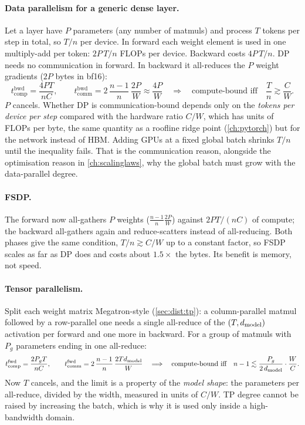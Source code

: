 \paragraph{Data parallelism for a generic dense layer.} Let a layer have $P$ parameters (any
number of matmuls) and process $T$ tokens per step in total, so $T/n$ per device. In forward each
weight element is used in one multiply-add per token: $2P\,T/n$ FLOPs per device. Backward costs
$4P\,T/n$. DP needs no communication in forward. In backward it all-reduces the $P$ weight
gradients ($2P$ bytes in bf16):
\[
  t_\text{comp}^\text{bwd} = \frac{4PT}{nC},\qquad
  t_\text{comm}^\text{bwd} = 2\,\frac{n-1}{n}\,\frac{2P}{W}\approx\frac{4P}{W}
  \quad\Longrightarrow\quad
  \text{compute-bound iff}\quad \frac{T}{n} \gtrsim \frac{C}{W}.
\]
$P$ cancels. Whether DP is communication-bound depends only on the \emph{tokens per device per
step} compared with the hardware ratio $C/W$, which has units of FLOPs per byte, the same
quantity as a roofline ridge point (\cref{ch:pytorch}) but for the network instead of HBM. Adding GPUs at
a fixed global batch shrinks $T/n$ until the inequality fails. That is the communication
reason, alongside the optimisation reason in \cref{ch:scalinglaws}, why the global batch must grow
with the data-parallel degree.

\paragraph{FSDP.} The forward now all-gathers $P$ weights ($\frac{n-1}{n}\frac{2P}{W}$) against
$2PT/(nC)$ of compute; the backward all-gathers again and reduce-scatters instead of all-reducing.
Both phases give the same condition, $T/n \gtrsim C/W$ up to a constant factor, so FSDP scales as far
as DP does and costs about $1.5\times$ the bytes. Its benefit is memory, not speed.

\paragraph{Tensor parallelism.} Split each weight matrix Megatron-style
(\cref{sec:dist:tp}): a column-parallel matmul followed by a row-parallel one needs a single
all-reduce of the $(T, d_{\text{model}})$ activation per forward and one more in backward. For a group of
matmuls with $P_g$ parameters ending in one all-reduce:
\[
  t_\text{comp}^\text{fwd} = \frac{2P_gT}{nC},\qquad
  t_\text{comm}^\text{fwd} = 2\,\frac{n-1}{n}\,\frac{2Td_{\text{model}}}{W}
  \quad\Longrightarrow\quad
  \text{compute-bound iff}\quad n - 1 \lesssim \frac{P_g}{2\,d_{\text{model}}}\cdot\frac{W}{C}.
\]
Now $T$ cancels, and the limit is a property of the \emph{model shape}: the parameters per
all-reduce, divided by the width, measured in units of $C/W$. TP degree cannot be raised by
increasing the batch, which is why it is used only inside a high-bandwidth domain.

